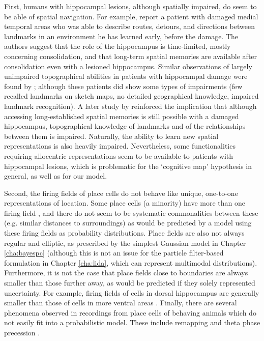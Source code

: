 First, humans with hippocampal lesions, although spatially impaired, do seem to be able of spatial navigation. For example, \citep{teng1999} report a patient with damaged medial temporal areas who was able to describe routes, detours, and directions between landmarks in an environment he has learned early, before the damage. The authors suggest that the role of the hippocampus is time-limited, mostly concerning consolidation, and that long-term spatial memories are available after consolidation even with a lesioned hippocampus. Similar observations of largely unimpaired topographical abilities in patients with hippocampal damage were found by \citep{rosenbaum2000, rosenbaum2005}; although these patients did show some types of impairments (few recalled landmarks on sketch maps, no detailed geographical knowledge, impaired landmark recognition). A later study by \cite{maguire2006} reinforced the implication that although accessing long-established spatial memories is still possible with a damaged hippocampus, topographical knowledge of landmarks and of the relationships between them is impaired. Naturally, the ability to learn new spatial representations is also heavily impaired. Nevertheless, some functionalities requiring allocentric representations seem to be available to patients with hippocampal lesions, which is problematic for the `cognitive map' hypothesis in general, as well as for our model.

Second, the firing fields of place cells do not behave like unique, one-to-one representations of location. Some place cells (a minority) have more than one firing field \citep{burke2011influence}, and there do not seem to be systematic commonalities between these (e.g. similar distances to surroundings) as would be predicted by a model using these firing fields as probability distributions. Place fields are also not always regular and elliptic, as prescribed by the simplest Gaussian model in Chapter \ref{cha:bayespc} (although this is not an issue for the particle filter-based formulation in Chapter \ref{cha:lida}, which can represent multimodal distributions). Furthermore, it is not the case that place fields close to boundaries are always smaller than those further away, as would be predicted if they solely represented uncertainty. For example, firing fields of cells in dorsal hippocampus are generally smaller than those of cells in more ventral areas \citep{kjelstrup2008finite}. Finally, there are several phenomena observed in recordings from place cells of behaving animals which do not easily fit into a probabilistic model. These include remapping \citep{colgin2008understanding} and theta phase precession \citep{skaggs1996theta}.

